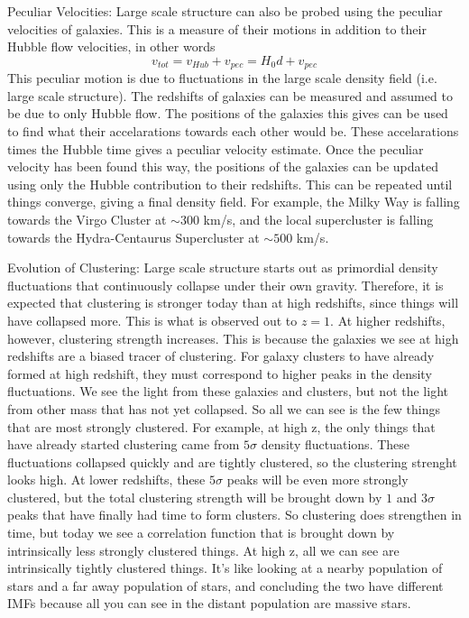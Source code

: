 Peculiar Velocities:\newline
Large scale structure can also be probed using the peculiar velocities of 
galaxies.  This is a measure of their motions in addition to their Hubble 
flow velocities, in other words
\begin{equation}
v_{tot}=v_{Hub}+v_{pec}=H_0d+v_{pec}
\end{equation}
This peculiar motion is due to fluctuations in the large scale density field 
(i.e. large scale structure).  The redshifts of galaxies can be measured and 
assumed to be due to only Hubble flow.  The positions of the galaxies this 
gives can be used to find what their accelarations towards each other would 
be.  These accelarations times the Hubble time gives a peculiar velocity 
estimate.  Once the peculiar velocity has been found this way, the positions 
of the galaxies can be updated using only the Hubble contribution to their 
redshifts.  This can be repeated until things converge, giving a final density 
field.  For example, the Milky Way is falling towards the Virgo 
Cluster at $\sim300$ km/s, and the local supercluster is falling towards the 
Hydra-Centaurus Supercluster at $\sim500$ km/s.

Evolution of Clustering:\newline
Large scale structure starts out as primordial density fluctuations that 
continuously collapse under their own gravity.  Therefore, it is expected 
that clustering is stronger today than at high redshifts, since things 
will have collapsed more.  This is what is observed out to $z=1$.  At higher 
redshifts, however, clustering strength increases.  This is because the 
galaxies we see at high redshifts are a biased tracer of clustering.  
For galaxy clusters to have already formed at high redshift, they must 
correspond to higher peaks in the density fluctuations.  We see the light 
from these galaxies and clusters, but not the light from other mass that 
has not yet collapsed.  So all we can see is the few things that are most 
strongly clustered.  For example, 
at high z, the only things that have already started clustering came from 
$5\sigma$ density fluctuations.  These fluctuations collapsed quickly and are 
tightly clustered, so the clustering strenght looks high.  At lower 
redshifts, these $5\sigma$ peaks will be even more strongly clustered, 
but the total clustering strength will be brought down by $1$ and $3\sigma$ 
peaks that have finally had time to form clusters.  So clustering does 
strengthen in time, but today we see a correlation function that is brought 
down by intrinsically less strongly clustered things.  At high z, all we 
can see are intrinsically tightly clustered things.  It's like looking at 
a nearby population of stars and a far away population of stars, and concluding 
the two have different IMFs because all you can see in the distant population 
are massive stars.  

